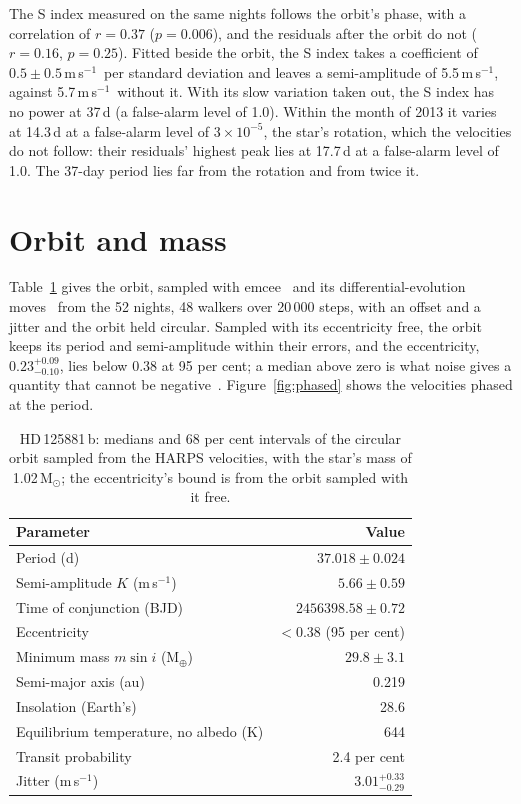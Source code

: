 \documentclass[3p,11pt]{elsarticle}
\newcommand{\ms}{m\,s$^{-1}$}
\newcommand{\Msun}{M$_\odot$}
\newcommand{\Mearth}{M$_\oplus$}
\begin{document}
The S index measured on the same nights follows the orbit's phase, with a correlation of $r = 0.37$
($p = 0.006$), and the residuals after the orbit do not ($r = 0.16$, $p = 0.25$). Fitted beside the
orbit, the S index takes a coefficient of $0.5 \pm 0.5$\,\ms\ per standard deviation and leaves a
semi-amplitude of 5.5\,\ms, against 5.7\,\ms\ without it. With its slow variation taken out, the S
index has no power at 37\,d (a false-alarm level of 1.0). Within the month of 2013 it varies at
14.3\,d at a false-alarm level of $3\times10^{-5}$, the star's rotation, which the velocities do not
follow: their residuals' highest peak lies at 17.7\,d at a false-alarm level of 1.0. The 37-day period
lies far from the rotation and from twice it.

\section{Orbit and mass}\label{sec:orbit}

Table~\ref{tab:orbit} gives the orbit, sampled with emcee~\cite{ForemanMackey2013} and its
differential-evolution moves~\cite{terBraak2006} from the 52 nights, 48 walkers over 20\,000 steps,
with an offset and a jitter and the orbit held circular. Sampled with its eccentricity free, the orbit
keeps its period and semi-amplitude within their errors, and the eccentricity, $0.23^{+0.09}_{-0.10}$,
lies below 0.38 at 95 per cent; a median above zero is what noise gives a quantity that cannot be
negative~\cite{Lucy1971}. Figure~\ref{fig:phased} shows the velocities phased at the period.

\begin{table}[!htbp]
\centering
\caption{HD\,125881\,b: medians and 68 per cent intervals of the circular orbit sampled from the HARPS
velocities, with the star's mass of 1.02\,\Msun; the eccentricity's bound is from the orbit sampled
with it free.}
\label{tab:orbit}
\begin{tabular}{l r}
\toprule
Parameter & Value \\
\midrule
Period (d) & $37.018 \pm 0.024$ \\
Semi-amplitude $K$ (\ms) & $5.66 \pm 0.59$ \\
Time of conjunction (BJD) & $2456398.58 \pm 0.72$ \\
Eccentricity & $< 0.38$ (95 per cent) \\
Minimum mass $m \sin i$ (\Mearth) & $29.8 \pm 3.1$ \\
Semi-major axis (au) & 0.219 \\
Insolation (Earth's) & 28.6 \\
Equilibrium temperature, no albedo (K) & 644 \\
Transit probability & 2.4 per cent \\
Jitter (\ms) & $3.01^{+0.33}_{-0.29}$ \\
\bottomrule
\end{tabular}
\end{table}
\end{document}
